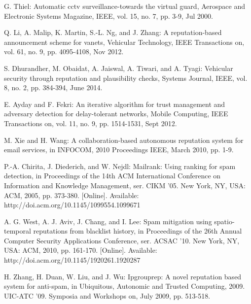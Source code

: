 \documentclass{llncs}
\begin{document}
\begin{thebibliography}{15}
G. Thiel: Automatic cctv surveillance-towards the virtual guard, Aerospace and Electronic Systems Magazine, IEEE, vol. 15, no. 7, pp. 3-9, Jul 2000.

Q. Li, A. Malip, K. Martin, S.-L. Ng, and J. Zhang: A reputation-based announcement scheme for vanets, Vehicular Technology, IEEE Transactions on, vol. 61, no. 9, pp. 4095-4108, Nov 2012.

S. Dhurandher, M. Obaidat, A. Jaiswal, A. Tiwari, and A. Tyagi: Vehicular security through reputation and plausibility checks, Systems Journal, IEEE, vol. 8, no. 2, pp. 384-394, June 2014.

E. Ayday and F. Fekri: An iterative algorithm for trust management and adversary detection for delay-tolerant networks, Mobile Computing, IEEE Transactions on, vol. 11, no. 9, pp. 1514-1531, Sept 2012.

M. Xie and H. Wang: A collaboration-based autonomous reputation system for email services, in INFOCOM, 2010 Proceedings IEEE, March 2010, pp. 1-9.


P.-A. Chirita, J. Diederich, and W. Nejdl: Mailrank: Using ranking for spam detection, in Proceedings of the 14th ACM International Conference on Information and Knowledge Management, ser. CIKM '05. New York, NY, USA: ACM, 2005, pp. 373-380. [Online]. Available: http://doi.acm.org/10.1145/1099554.1099671

A. G. West, A. J. Aviv, J. Chang, and I. Lee: Spam mitigation using spatio-temporal reputations from blacklist history, in Proceedings of the 26th Annual Computer Security Applications Conference, ser. ACSAC '10. New York, NY, USA: ACM, 2010, pp. 161-170. [Online]. Available: http://doi.acm.org/10.1145/1920261.1920287

H. Zhang, H. Duan, W. Liu, and J. Wu: Ipgrouprep: A novel reputation based system for anti-spam, in Ubiquitous, Autonomic and Trusted Computing, 2009. UIC-ATC '09. Symposia and Workshops on, July 2009, pp. 513-518.


\end{thebibliography}
\end{document}
